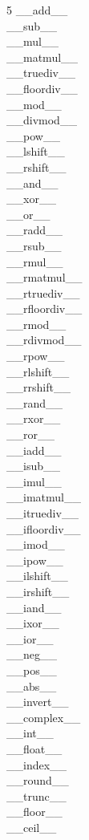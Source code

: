 \documentclass [8pt] {extarticle}
\begin{document}
    \begin {multicols} {5}
    \_\_add\_\_ \\
    \_\_sub\_\_ \\
    \_\_mul\_\_ \\
    \_\_matmul\_\_ \\
    \_\_truediv\_\_ \\
    \_\_floordiv\_\_ \\
    \_\_mod\_\_ \\
    \_\_divmod\_\_ \\
    \_\_pow\_\_ \\
    \_\_lshift\_\_ \\
    \_\_rshift\_\_ \\
    \_\_and\_\_ \\
    \_\_xor\_\_ \\
    \_\_or\_\_ \\
    \_\_radd\_\_ \\
    \_\_rsub\_\_ \\
    \_\_rmul\_\_ \\
    \_\_rmatmul\_\_ \\
    \_\_rtruediv\_\_ \\
    \_\_rfloordiv\_\_ \\
    \_\_rmod\_\_ \\
    \_\_rdivmod\_\_ \\
    \_\_rpow\_\_ \\
    \_\_rlshift\_\_ \\
    \_\_rrshift\_\_ \\
    \_\_rand\_\_ \\
    \_\_rxor\_\_ \\
    \_\_ror\_\_ \\
    \_\_iadd\_\_ \\
    \_\_isub\_\_ \\
    \_\_imul\_\_ \\
    \_\_imatmul\_\_ \\
    \_\_itruediv\_\_ \\
    \_\_ifloordiv\_\_ \\
    \_\_imod\_\_ \\
    \_\_ipow\_\_ \\
    \_\_ilshift\_\_ \\
    \_\_irshift\_\_ \\
    \_\_iand\_\_ \\
    \_\_ixor\_\_ \\
    \_\_ior\_\_ \\
    \_\_neg\_\_ \\
    \_\_pos\_\_ \\
    \_\_abs\_\_ \\
    \_\_invert\_\_ \\
    \_\_complex\_\_ \\
    \_\_int\_\_ \\
    \_\_float\_\_ \\
    \_\_index\_\_ \\
    \_\_round\_\_ \\
    \_\_trunc\_\_ \\
    \_\_floor\_\_ \\
    \_\_ceil\_\_ \\
    \end {multicols}
\end{document}
